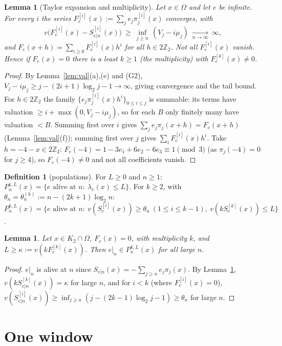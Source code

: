 \documentclass[11pt]{amsart}
\newtheorem{lemma}[theorem]{Lemma}
\theoremstyle{definition}
\newtheorem{definition}[theorem]{Definition}
\newcommand{\Z}{\mathbb Z}
\begin{document}
\begin{lemma}[Taylor expansion and multiplicity]\label{lem:mult}
Let $x\in\Omega$ and let $e$ be infinite. For every $i$ the series $F_e^{[i]}(x):=\sum_j e_j\pi_j^{[i]}(x)$ converges, with
\[ v\big(F_e^{[i]}(x)-S^{[i]}_{e|n}(x)\big)\ \ge\ \inf_{j\ge n}\,(V_j-i\mu_j)\ \xrightarrow[n\to\infty]{}\ \infty, \]
and $F_e(x+h)=\sum_{i\ge0}F_e^{[i]}(x)h^i$ for all $h\in2\Z_2$. Not all $F_e^{[i]}(x)$ vanish. Hence if $F_e(x)=0$ there is a
least $k\ge1$ (the multiplicity) with $F^{[k]}_e(x)\ne0$.
\end{lemma}
\begin{proof}
By Lemma~\ref{lem:val}(a),(e) and (G2), $V_j-i\mu_j\ge j-(2i+1)\log_2j-1\to\infty$, giving convergence and the tail bound.
For $h\in2\Z_2$ the family $\{e_j\pi_j^{[i]}(x)h^i\}_{0\le i\le j}$ is summable: its terms have valuation
$\ge i+\max(0,V_j-i\mu_j)$, so for each $B$ only finitely many have valuation $<B$. Summing first over $i$ gives
$\sum_je_j\pi_j(x+h)=F_e(x+h)$ (Lemma~\ref{lem:val}(f)); summing first over $j$ gives $\sum_iF^{[i]}_e(x)h^i$.
Take $h=-4-x\in2\Z_2$: $F_e(-4)=1-3e_1+6e_2-6e_3\equiv1\pmod 3$ (as $\pi_j(-4)=0$ for $j\ge4$), so $F_e(-4)\ne0$ and
not all coefficients vanish.
\end{proof}

\begin{definition}[populations]
For $L\ge0$ and $n\ge1$: $P^{1,L}_n(x)=\{e\text{ alive at }n:\ \lambda_e(x)\le L\}$.
For $k\ge2$, with $\theta_n=\theta^{(k)}_n:=n-(2k+1)\log_2 n$:
$P^{k,L}_n(x)=\{e\text{ alive at }n:\ v(S_e^{[i]}(x))\ge\theta_n\ (1\le i\le k-1),\ v(kS_e^{[k]}(x))\le L\}$.
\end{definition}

\begin{lemma}\label{lem:inpop}
Let $x\in K_2\cap\Omega$, $F_e(x)=0$, with multiplicity $k$, and $L\ge\kappa:=v(kF^{[k]}_e(x))$. Then
$e|_n\in P^{k,L}_n(x)$ for all large $n$.
\end{lemma}
\begin{proof}
$e|_n$ is alive at $n$ since $S_{e|n}(x)=-\sum_{j\ge n}e_j\pi_j(x)$. By Lemma~\ref{lem:mult},
$v(kS^{[k]}_{e|n}(x))=\kappa$ for large $n$, and for $i<k$ (where $F^{[i]}_e(x)=0$),
$v(S^{[i]}_{e|n}(x))\ge\inf_{j\ge n}(j-(2k-1)\log_2j-1)\ge\theta_n$ for large $n$.
\end{proof}

\section{One window}
\end{document}
